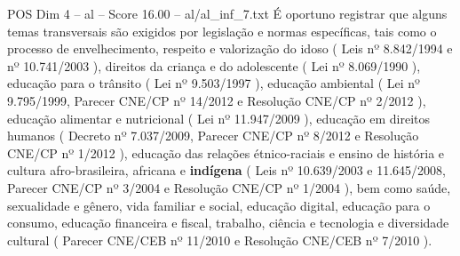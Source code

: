 \begin{textsample}{POS Dim 4 – al – Score 16.00 – al/al\_inf\_7.txt}
É oportuno registrar que alguns temas transversais são exigidos por legislação e normas específicas, tais como o processo de envelhecimento, respeito e valorização do idoso ( Leis nº 8.842/1994 e nº 10.741/2003 ), direitos da criança e do adolescente ( Lei nº 8.069/1990 ), educação para o trânsito ( Lei nº 9.503/1997 ), educação ambiental ( Lei nº 9.795/1999, Parecer CNE/CP nº 14/2012 e Resolução CNE/CP nº 2/2012 ), educação alimentar e nutricional ( Lei nº 11.947/2009 ), educação em direitos humanos ( Decreto nº 7.037/2009, Parecer CNE/CP nº 8/2012 e Resolução CNE/CP nº 1/2012 ), educação das relações étnico-raciais e ensino de história e cultura afro-brasileira, africana e \textbf{indígena} ( Leis nº 10.639/2003 e 11.645/2008, Parecer CNE/CP nº 3/2004 e Resolução CNE/CP nº 1/2004 ), bem como saúde, sexualidade e gênero, vida familiar e social, educação digital, educação para o consumo, educação financeira e fiscal, trabalho, ciência e tecnologia e diversidade cultural ( Parecer CNE/CEB nº 11/2010 e Resolução CNE/CEB nº 7/2010 ).

\end{textsample}
